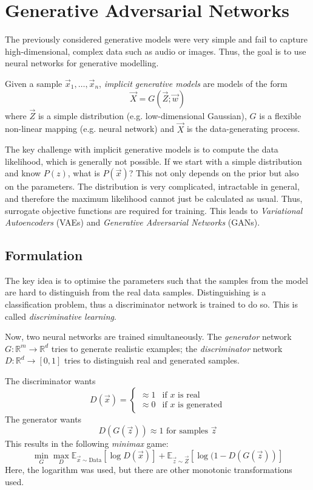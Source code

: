 \section{Generative Adversarial Networks}
The previously considered generative models
were very simple and fail to capture high-dimensional,
complex data such as audio or images.
Thus, the goal is to use neural networks
for generative modelling.

Given a sample $\vec{x}_1, \dotsc, \vec{x}_n$,
\emph{implicit generative models} are models
of the form
\begin{equation*}
    \vec{X} = G(\vec{Z}; \vec{w})
\end{equation*}
where $\vec{Z}$ is a simple distribution
(e.g. low-dimensional Gaussian),
$G$ is a flexible non-linear mapping
(e.g. neural network)
and $\vec{X}$ is the data-generating process.

The key challenge with implicit generative models
is to compute the data likelihood,
which is generally not possible.
If we start with a simple distribution
and know $P(z)$, what is $P(\vec{x})$?
This not only depends on the prior but
also on the parameters.
The distribution is very complicated,
intractable in general,
and therefore the maximum likelihood
cannot just be calculated as usual.
Thus, surrogate objective functions
are required for training.
This leads to
\emph{Variational Autoencoders} (VAEs)
and \emph{Generative Adversarial Networks} (GANs).

\subsection{Formulation}
The key idea is to optimise the parameters
such that the samples from the model are
hard to distinguish from the real data samples.
Distinguishing is a classification problem,
thus a discriminator network is trained to do so.
This is called \emph{discriminative learning}.

Now, two neural networks are trained simultaneously.
The \emph{generator} network $G : \mathbb{R}^m \to \mathbb{R}^d$
tries to generate realistic examples;
the \emph{discriminator} network
$D : \mathbb{R}^d \to [0, 1]$
tries to distinguish real and generated samples.

The discriminator wants
\begin{equation*}
    D(\vec{x}) =
    \begin{cases}
        \approx 1 & \text{if $x$ is real} \\
        \approx 0 & \text{if $x$ is generated}
    \end{cases}
\end{equation*}
The generator wants
\begin{equation*}
    D(G(\vec{z})) \approx 1 \text{ for samples $\vec{z}$}
\end{equation*}
This results in the following \emph{minimax} game:
\begin{equation*}
    \min_G{\max_D{
        \mathbb{E}_{\vec{x} \sim \text{Data}}[\log{D(\vec{x})}]
        +
        \mathbb{E}_{\vec{z} \sim \vec{Z}}[\log{(1 - D(G(\vec{z}))}]
    }}
\end{equation*}
Here, the logarithm was used,
but there are other monotonic
transformations used.



